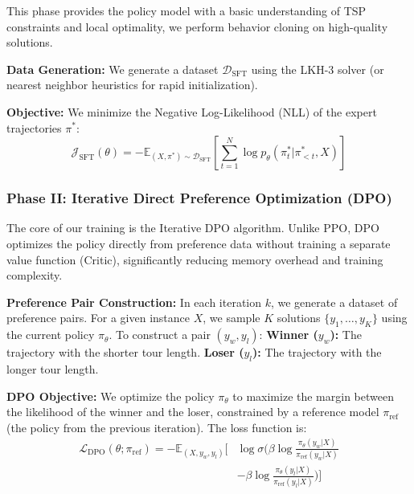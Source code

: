 \documentclass{article}
\theoremstyle{plain}
\theoremstyle{definition}
\theoremstyle{remark}
\begin{document}
This phase provides the policy model with a basic understanding of TSP constraints and local optimality, we perform behavior cloning on high-quality solutions.

\textbf{Data Generation:} We generate a dataset $\mathcal{D}_{\text{SFT}}$ using the LKH-3 solver (or nearest neighbor heuristics for rapid initialization).

\textbf{Objective:} We minimize the Negative Log-Likelihood (NLL) of the expert trajectories $\pi^*$:
\vspace{-10pt}
\begin{equation}
    \mathcal{J}_{\text{SFT}}(\theta) = - \mathbb{E}_{(X, \pi^*) \sim \mathcal{D}_{\text{SFT}}} \left[ \sum_{t=1}^N \log p_\theta(\pi_t^* | \pi_{<t}^*, X) \right]
\end{equation}
\vspace{-10pt}
\subsubsection{Phase II: Iterative Direct Preference Optimization (DPO)}

The core of our training is the Iterative DPO algorithm. Unlike PPO, DPO optimizes the policy directly from preference data without training a separate value function (Critic), significantly reducing memory overhead and training complexity.

\textbf{Preference Pair Construction:} In each iteration $k$, we generate a dataset of preference pairs. For a given instance $X$, we sample $K$ solutions $\{y_1, \dots, y_K\}$ using the current policy $\pi_{\theta}$. To construct a pair $(y_w, y_l)$:
\textbf{Winner ($y_w$):} The trajectory with the shorter tour length. \textbf{Loser ($y_l$):} The trajectory with the longer tour length.

\textbf{DPO Objective:} We optimize the policy $\pi_\theta$ to maximize the margin between the likelihood of the winner and the loser, constrained by a reference model $\pi_{\text{ref}}$ (the policy from the previous iteration). The loss function is:
\vspace{-5pt}
\begin{equation}
\begin{split}
\mathcal{L}_{\text{DPO}}(\theta; \pi_{\text{ref}}) = 
- \mathbb{E}_{(X, y_w, y_l)} \bigg[ 
& \log \sigma \bigg( \beta \log \frac{\pi_\theta(y_w|X)}{\pi_{\text{ref}}(y_w|X)} \\
& - \beta \log \frac{\pi_\theta(y_l|X)}{\pi_{\text{ref}}(y_l|X)} \bigg) \bigg]
\end{split}
\end{equation}
\end{document}
